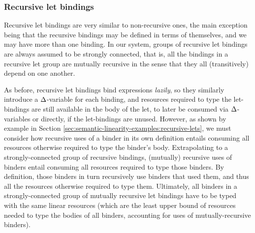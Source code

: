 \documentclass[acmsmall, screen, review]{acmart}
\begin{document}

\subsubsection{Recursive let bindings}

Recursive let bindings are very similar to non-recursive ones, the main
exception being that the recursive bindings may be defined in terms of
themselves, and we may have more than one binding. In our system, groups of
recursive let bindings are always assumed to be strongly connected, that is,
all the bindings in a recursive let group are mutually recursive in the sense
that they all (transitively) depend on one another.

As before, recursive let bindings bind expressions \emph{lazily}, so they similarly
introduce a $\Delta$-variable for each binding, and resources required to type the
let-bindings are still available in the body of the let, to later be consumed
via $\Delta$-variables or directly, if the let-bindings are unused.
%
However, as shown by example in Section
\ref{sec:semantic-linearity-examples:recursive-lets}, we must consider how
recursive uses of a binder in its own definition entails consuming all resources otherwise
required to type the binder's body.
%
Extrapolating to a strongly-connected group of recursive bindings, (mutually)
recursive uses of binders entail consuming all resources
required to type those binders. By definition, those binders in turn
recursively use binders that used them, and thus all the resources otherwise
required to type them.
%
Ultimately, all binders in a strongly-connected group of mutually recursive let
bindings have to be typed with the same linear resources (which are the least
upper bound of resources needed to type the bodies of all binders, accounting
for uses of mutually-recursive binders).
%
\end{document}
